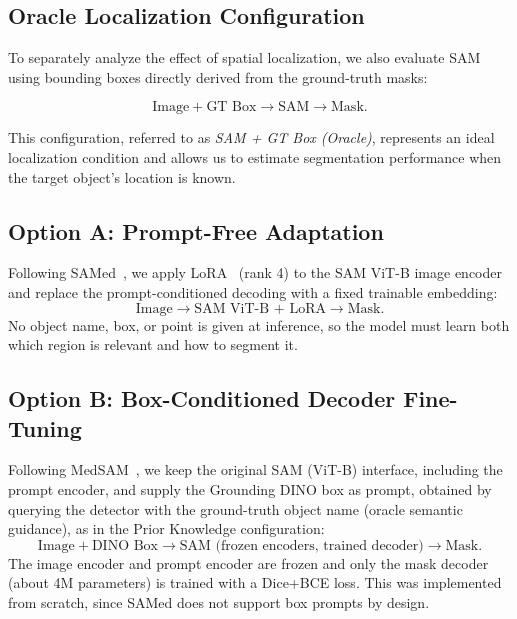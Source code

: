 \documentclass[conference]{IEEEtran}
\begin{document}
\subsection{Oracle Localization Configuration}

To separately analyze the effect of spatial localization, we also evaluate SAM using bounding boxes directly derived from the ground-truth masks:

\begin{equation*}
\text{Image} + \text{GT Box} \rightarrow
\text{SAM} \rightarrow
\text{Mask}.
\end{equation*}

This configuration, referred to as \textit{SAM + GT Box (Oracle)}, represents an ideal localization condition and allows us to estimate segmentation performance when the target object's location is known.


\subsection{Option A: Prompt-Free Adaptation}
Following SAMed~\cite{samed}, we apply LoRA~\cite{lora} (rank 4) to the SAM ViT-B image encoder and replace the prompt-conditioned decoding with a fixed trainable embedding:
\begin{equation*}
\text{Image} \rightarrow \text{SAM ViT-B + LoRA} \rightarrow \text{Mask}.
\end{equation*}
No object name, box, or point is given at inference, so the model must learn both which region is relevant and how to segment it.

\subsection{Option B: Box-Conditioned Decoder Fine-Tuning}
Following MedSAM~\cite{medsam}, we keep the original SAM (ViT-B) interface, including the prompt encoder, and supply the Grounding DINO box as prompt, obtained by querying the detector with the ground-truth object name (oracle semantic guidance), as in the Prior Knowledge configuration:
\begin{equation*}
\text{Image} + \text{DINO Box} \rightarrow \text{SAM (frozen encoders, trained decoder)} \rightarrow \text{Mask}.
\end{equation*}
The image encoder and prompt encoder are frozen and only the mask decoder (about 4M parameters) is trained with a Dice+BCE loss. This was implemented from scratch, since SAMed does not support box prompts by design.
\end{document}
